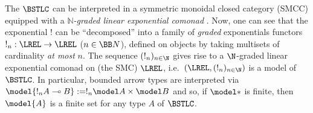 The $\BSTLC$ can be interpreted in a symmetric monoidal closed category (SMCC) equipped with a \emph{$\mathbb N$-graded linear exponential comonad} \cite{Katsumata2018}.
Now, one can see that the exponential $!$ can be ``decomposed'' into a family of \emph{graded} exponentials functors $!_n:\LREL\to\LREL$ ($n\in\BB N$), defined on objects by taking multisets of cardinality \emph{at most} $n$. %
The sequence $(!_n)_{n\in\N}$ gives rise to a $\N$-graded linear exponential comonad on (the SMC) $\LREL$, %
i.e.\ $(\LREL,(!_n)_{n\in\N})$ is a model of $\BSTLC$. 
In particular, bounded arrow types are interpreted via $\model{!_{n}A\multimap B}:= !_{n}\model A \times \model B$ and so, 
if $\model *$ is finite, then $\model{A}$ is a finite set for any type $A$ of $\BSTLC$.


